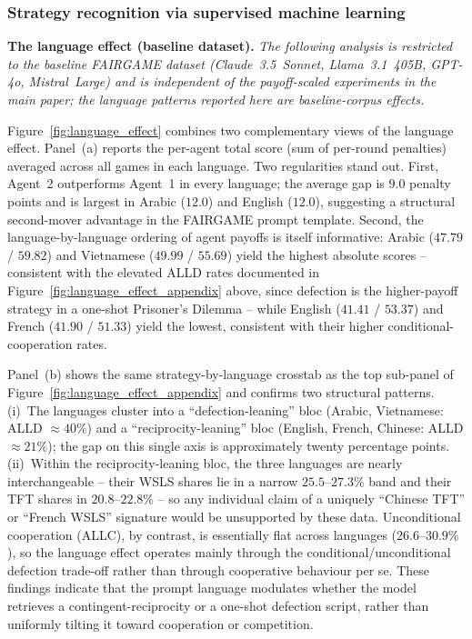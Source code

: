 \documentclass[a4paper,fleqn]{cas-sc}
\begin{document}
\subsubsection{Strategy recognition via supervised machine learning}\label{appendix:ml}

\noindent\textbf{The language effect (baseline dataset).} \emph{The following analysis is restricted to the baseline FAIRGAME dataset (Claude~3.5~Sonnet, Llama~3.1~405B, GPT-4o, Mistral~Large) and is independent of the payoff-scaled experiments in the main paper; the language patterns reported here are baseline-corpus effects.}

Figure~\ref{fig:language_effect} combines two complementary views of the language effect. Panel~(a) reports the per-agent total score (sum of per-round penalties) averaged across all games in each language. Two regularities stand out. First, Agent~2 outperforms Agent~1 in every language; the average gap is $9.0$ penalty points and is largest in Arabic ($12.0$) and English ($12.0$), suggesting a structural second-mover advantage in the FAIRGAME prompt template. Second, the language-by-language ordering of agent payoffs is itself informative: Arabic ($47.79$ / $59.82$) and Vietnamese ($49.99$ / $55.69$) yield the highest absolute scores -- consistent with the elevated ALLD rates documented in Figure~\ref{fig:language_effect_appendix} above, since defection is the higher-payoff strategy in a one-shot Prisoner's Dilemma -- while English ($41.41$ / $53.37$) and French ($41.90$ / $51.33$) yield the lowest, consistent with their higher conditional-cooperation rates.

Panel~(b) shows the same strategy-by-language crosstab as the top sub-panel of Figure~\ref{fig:language_effect_appendix} and confirms two structural patterns. (i)~The languages cluster into a ``defection-leaning'' bloc (Arabic, Vietnamese: ALLD $\approx 40\%$) and a ``reciprocity-leaning'' bloc (English, French, Chinese: ALLD $\approx 21\%$); the gap on this single axis is approximately twenty percentage points. (ii)~Within the reciprocity-leaning bloc, the three languages are nearly interchangeable -- their WSLS shares lie in a narrow $25.5$--$27.3\%$ band and their TFT shares in $20.8$--$22.8\%$ -- so any individual claim of a uniquely ``Chinese TFT'' or ``French WSLS'' signature would be unsupported by these data. Unconditional cooperation (ALLC), by contrast, is essentially flat across languages ($26.6$--$30.9\%$), so the language effect operates mainly through the conditional/unconditional defection trade-off rather than through cooperative behaviour per se. These findings indicate that the prompt language modulates whether the model retrieves a contingent-reciprocity or a one-shot defection script, rather than uniformly tilting it toward cooperation or competition.
\end{document}

